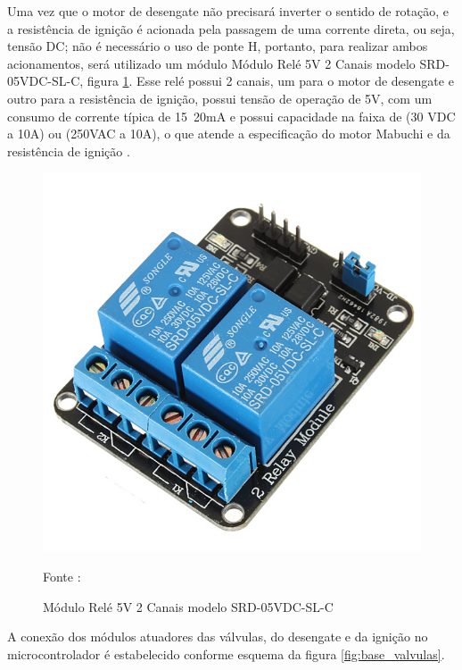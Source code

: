 \par Uma vez que o motor de desengate não precisará inverter o sentido de rotação, e a resistência de ignição é acionada pela passagem de uma corrente direta, ou seja, tensão DC; não é necessário o uso de ponte H, portanto, para realizar ambos acionamentos, será utilizado um módulo  Módulo Relé 5V 2 Canais modelo SRD-05VDC-SL-C, figura \ref{fig:RELE_2CHANNEL}. Esse relé possui 2 canais, um para o motor de desengate e outro para a resistência de ignição, possui tensão de operação de 5V, com um consumo de corrente típica de 15~20mA e possui capacidade na faixa de (30 VDC a 10A) ou (250VAC a 10A), o que atende a especificação do motor Mabuchi e da resistência de ignição \cite{rele_two}.

\begin{figure}[H]
  \centering
  \includegraphics[scale=0.3]{figuras/RELE_2CHANNEL.jpg}
  \caption{ Módulo Relé 5V 2 Canais modelo SRD-05VDC-SL-C} 
  {\footnotesize Fonte : \cite{rele_photo}} 
  \label{fig:RELE_2CHANNEL}
\end{figure}

\par A conexão dos módulos atuadores das válvulas, do desengate e da ignição no microcontrolador é estabelecido conforme esquema da figura \ref{fig:base_valvulas}.

